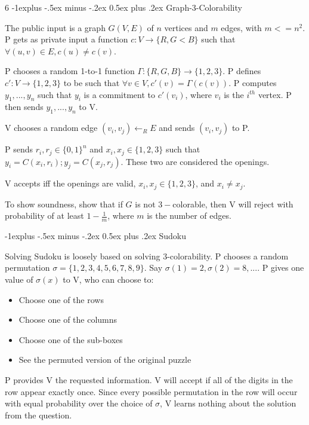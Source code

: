 \documentclass[2pt]{scrartcl}
\makeatletter
\renewcommand{\subsection}{\@startsection{subsection}{2}{0mm}
  {-1explus -.5ex minus -.2ex}
  {0.5ex plus .2ex}
{\normalfont\normalsize\bfseries}}
\makeatother
\begin{document}
\begin{multicols}{6}
  \subsection{Graph-3-Colorability}

  The public input is a graph $G(V, E)$ of $n$ vertices and $m$ edges, with $m <= n^2$. P gets as private input a function $c: V \rightarrow \{R, G< B\}$ such that $\forall (u, v) \in E, c(u) \neq c(v)$.

  P chooses a random 1-to-1 function $\Gamma: \{R, G, B\} \rightarrow \{1, 2, 3\}$. P defines $c': V \rightarrow \{1, 2, 3\}$ to be such that $\forall v \in V, c'(v) = \Gamma(c(v))$. P computes $y_1, ..., y_n$ such that $y_i$ is a commitment to $c'(v_i)$, where $v_i$ is the $i^{th}$ vertex. P then sends $y_1, ..., y_n$ to V.

  V chooses a random edge $(v_i, v_j) \leftarrow_R E$ and sends $(v_i, v_j)$ to P.

  P sends $r_i, r_j \in \{0, 1\}^n$ and $x_i, x_j \in \{1, 2, 3\}$ such that $y_i = C(x_i, r_i); y_j = C(x_j, r_j)$. These two are considered the openings.

  V accepts iff the openings are valid, $x_i, x_j \in \{1, 2, 3\}$, and $x_i \neq x_j$.

  To show soundness, show that if $G$ is not $3-$colorable, then V will reject with probability of at least $1 - \frac{1}{m}$, where $m$ is the number of edges.

  \subsection{Sudoku}

  Solving Sudoku is loosely based on solving 3-colorability. P chooses a random permutation $\sigma = \{1, 2, 3, 4, 5, 6, 7, 8, 9\}$. Say $\sigma(1) = 2, \sigma(2) = 8, ...$. P gives one value of $\sigma(x)$ to V, who can choose to:
  
  \begin{itemize}
      \item Choose one of the rows
      \item Choose one of the columns
      \item Choose one of the sub-boxes
      \item See the permuted version of the original puzzle
  \end{itemize}
  
  P provides V the requested information. V will accept if all of the digits in the row appear exactly once. Since every possible permutation in the row will occur with equal probability over the choice of $\sigma$, V learns nothing about the solution from the question.
  

\end{multicols}
\end{document}

